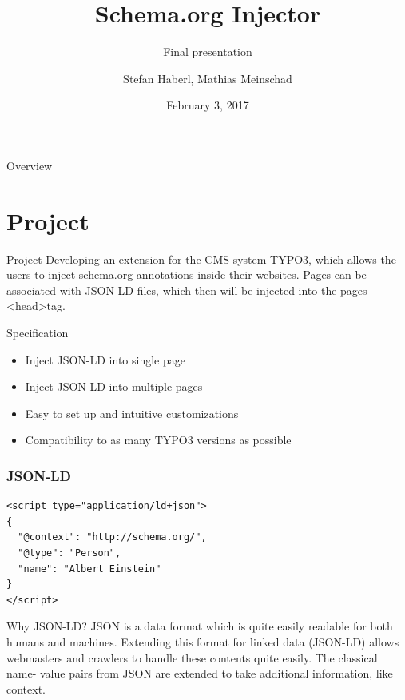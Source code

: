 \documentclass{beamer}
\title{Schema.org Injector}
\subtitle{Final presentation}
\author{Stefan Haberl, Mathias Meinschad}
\institute{STI Innsbruck}
\date{February 3, 2017}
\begin{document}
\begin{frame}
  \titlepage
\end{frame}

\begin{frame}{Overview}
  \tableofcontents
\end{frame}

\section{Project}

\begin{frame}{Project}
Developing an extension for the CMS-system TYPO3, which allows the users to inject schema.org annotations inside their websites.
Pages can be associated with JSON-LD files, which then will be injected into the pages \textless head\textgreater{tag}. 



\begin{block}{Specification}
\begin{itemize}
\item Inject JSON-LD into single page
\item Inject JSON-LD into multiple pages
\item Easy to set up and intuitive customizations
\item Compatibility to as many TYPO3 versions as possible
\end{itemize}
\end{block}
\end{frame}


\begin{frame}[fragile]
\frametitle{JSON-LD}
\begin{block}{}
\begin{lstlisting}
<script type="application/ld+json">
{
  "@context": "http://schema.org/",
  "@type": "Person",
  "name": "Albert Einstein"
}
</script>
\end{lstlisting}
\end{block}
\begin{block}{Why JSON-LD?}
JSON is a data format which is quite easily readable for both humans and machines.
Extending this format for linked data (JSON-LD) allows webmasters and crawlers to handle these contents quite easily. The classical name- value pairs from JSON are extended to take additional information, like context.
\end{block}

\end{frame}
\end{document}
